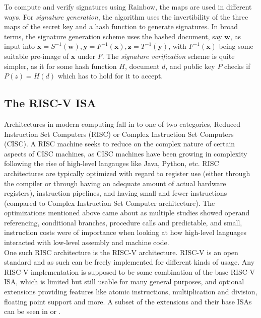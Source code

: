 To compute and verify signatures using Rainbow, the maps are used in different ways.
For \textit{signature generation}, the algorithm uses the invertibility of the three maps of the secret key and a hash function to generate signatures. In broad terms, the signature generation scheme uses the hashed document, say $\mathbf{w}$, as input into $\mathbf{x} = S^{-1}(\mathbf{w}), \mathbf{y} = F^{-1}(\mathbf{x}), \mathbf{z} = T^{-1}(\mathbf{y})$, with $F^{-1}(\mathbf{x})$ being some suitable pre-image of $\mathbf{x}$ under $F$. The \textit{signature verification} scheme is quite simpler, as it for some hash function $H$, document $d$, and public key $P$ checks if $P(z) = H(d)$ which has to hold for it to accept. \cite{multicrypto}

\subsection{The RISC-V ISA} \label{pre-riscv}
Architectures in modern computing fall in to one of two categories, Reduced Instruction Set Computers (RISC) or Complex Instruction Set Computers (CISC). A RISC machine seeks to reduce on the complex nature of certain aspects of CISC machines, as CISC machines have been growing in complexity following the rise of high-level langauges like Java, Python, etc. RISC architectures are typically optimized with regard to register use (either through the compiler or through having an adequate amount of actual hardware registers), instruction pipelines, and having small and fewer instructions (compared to Complex Instruction Set Computer architecture). The optimizations mentioned above came about as multiple studies showed operand referencing, conditional branches, procedure calls and predictable, and small, instruction costs were of importance when looking at how high-level languages interacted with low-level assembly and machine code. \cite{stallings}\medskip\\
One such RISC architecture is the RISC-V architecture. RISC-V is an open standard and as such can be freely implemented for different kinds of usage. Any RISC-V implementation is supposed to be some combination of the base RISC-V ISA, which is limited but still usable for many general purposes, and optional extensions providing features like atomic instructions, multiplication and division, floating point support and more. A subset of the extensions and their base ISAs can be seen in \cite{riscvmodular} or \cite{riscdesign}.
\medskip\\

